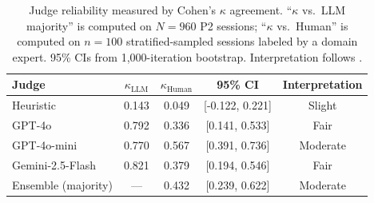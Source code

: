 \begin{table}[t]
\centering
\caption{Judge reliability measured by Cohen's $\kappa$ agreement. ``$\kappa$ vs.\ LLM majority'' is computed on $N = 960$ P2 sessions; ``$\kappa$ vs.\ Human'' is computed on $n = 100$ stratified-sampled sessions labeled by a domain expert. 95\% CIs from 1{,}000-iteration bootstrap. Interpretation follows \citet{landis1977kappa}.}
\label{tab:judge}
\begin{tabular}{l c c c c}
\toprule
Judge & $\kappa_{\mathrm{LLM}}$ & $\kappa_{\mathrm{Human}}$ & 95\% CI & Interpretation \\
\midrule
Heuristic & 0.143 & 0.049 & [-0.122, 0.221] & Slight \\
GPT-4o & 0.792 & 0.336 & [0.141, 0.533] & Fair \\
GPT-4o-mini & 0.770 & 0.567 & [0.391, 0.736] & Moderate \\
Gemini-2.5-Flash & 0.821 & 0.379 & [0.194, 0.546] & Fair \\
Ensemble (majority) & --- & 0.432 & [0.239, 0.622] & Moderate \\
\bottomrule
\end{tabular}
\end{table}
